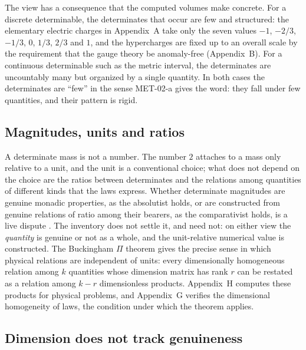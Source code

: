 \documentclass{situationist-preprint}
\begin{document}
The view has a consequence that the computed volumes make concrete. For a discrete determinable, the determinates that occur are few and structured: the elementary electric charges in Appendix~A take only the seven values $-1$, $-2/3$, $-1/3$, $0$, $1/3$, $2/3$ and $1$, and the hypercharges are fixed up to an overall scale by the requirement that the gauge theory be anomaly-free (Appendix~B). For a continuous determinable such as the metric interval, the determinates are uncountably many but organized by a single quantity. In both cases the determinates are \enquote{few} in the sense MET-02-a gives the word: they fall under few quantities, and their pattern is rigid.

\subsection{Magnitudes, units and ratios}

A determinate mass is not a number. The number $2$ attaches to a mass only relative to a unit, and the unit is a conventional choice; what does not depend on the choice are the ratios between determinates and the relations among quantities of different kinds that the laws express. Whether determinate magnitudes are genuine monadic properties, as the absolutist holds, or are constructed from genuine relations of ratio among their bearers, as the comparativist holds, is a live dispute \citep{Mundy1987,Dasgupta2013,Eddon2013}. The inventory does not settle it, and need not: on either view the \emph{quantity} is genuine or not as a whole, and the unit-relative numerical value is constructed. The Buckingham $\Pi$ theorem \citep{Buckingham1914,Bridgman1922} gives the precise sense in which physical relations are independent of units: every dimensionally homogeneous relation among $k$ quantities whose dimension matrix has rank $r$ can be restated as a relation among $k-r$ dimensionless products. Appendix~H computes these products for \vvNH{} physical problems, and Appendix~G verifies the dimensional homogeneity of \vvNG{} laws, the condition under which the theorem applies.

\subsection{Dimension does not track genuineness}\label{ss:si}
\end{document}
